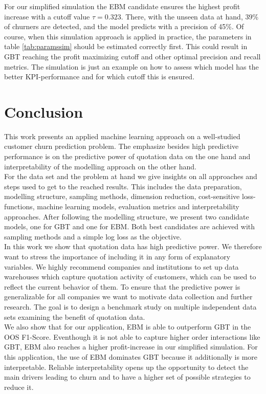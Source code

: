 \documentclass[12pt,titlepage]{article}
\begin{document}
\noindent
For our simplified simulation the EBM candidate ensures the highest profit increase with a cutoff value $\tau=0.323$. There, with the unseen data at hand, 39\% of churners are detected, and the model predicts with a precision of 45\%. Of course, when this simulation approach is applied in practice, the parameters in table \ref{tab:paramssim} should be estimated correctly first. This could result in GBT reaching the profit maximizing cutoff and other optimal precision and recall metrics. The simulation is just an example on how to assess which model has the better KPI-performance and for which cutoff this is ensured. \\

\section{Conclusion} \par

This work presents an applied machine learning approach on a well-studied customer churn prediction problem. The emphasize besides high predictive performance is on the predictive power of quotation data on the one hand and interpretability of the modelling approach on the other hand. \\
For the data set and the problem at hand we give insights on all approaches and steps used to get to the reached results. This includes the data preparation, modelling structure, sampling methods, dimension reduction, cost-sensitive loss-functions, machine learning models, evaluation metrics and interpretability approaches. After following the modelling structure, we present two candidate models, one for GBT and one for EBM. Both best candidates are achieved with sampling methods and a simple log loss as the objective. \\
In this work we show that quotation data has high predictive power. We therefore want to stress the importance of including it in any form of explanatory variables. We highly recommend companies and institutions to set up data warehouses which capture quotation activity of customers, which can be used to reflect the current behavior of them. To ensure that the predictive power is generalizable for all companies we want to motivate data collection and further research. The goal is to design a benchmark study on multiple independent data sets examining the benefit of quotation data. \\
We also show that for our application, EBM is able to outperform GBT in the OOS F1-Score. Eventhough it is not able to capture higher order interactions like GBT, EBM also reaches a higher profit-increase in our simplified simulation. For this application, the use of EBM dominates GBT because it additionally is more interpretable. Reliable interpretability opens up the opportunity to detect the main drivers leading to churn and to have a higher set of possible strategies to reduce it. \\
\end{document}

